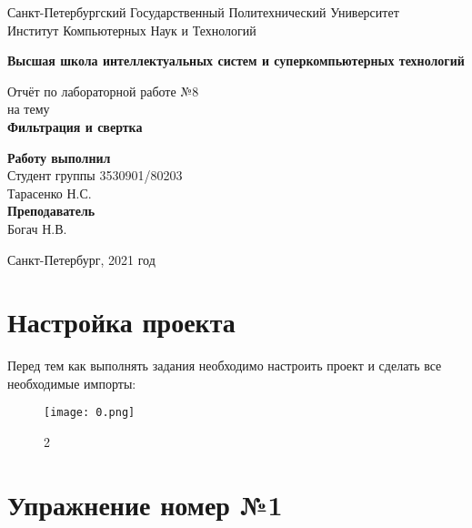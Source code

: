 \documentclass[10pt,a4paper,oneside]{article}
\begin{document}
\begin{titlepage}
\newpage
	\begin{center}
		\Large Санкт-Петербургский Государственный Политехнический Университет\\
		Институт Компьютерных Наук и Технологий\\
	\end{center}
	\begin{center}
		\large\textbf {Высшая школа интеллектуальных систем и суперкомпьютерных технологий}
	\end{center}
	
	\vspace{5em}
	\begin{center}
		\large{Отчёт по лабораторной работе №8 \\ на тему \\
		\textbf{Фильтрация и свертка} }
	\end{center}
	
	\vspace{25em}
	\begin{flushright}
		\textbf{Работу выполнил\\}Студент группы 3530901/80203 \\ Тарасенко Н.С.\\
		\textbf{Преподаватель\\}Богач Н.В. 
	\end{flushright}
	
	\vspace{\fill}%
	\begin{center}
	Санкт-Петербург, 2021 год	
	\end{center}
\end{titlepage} %

\section{Настройка проекта}
Перед тем как выполнять задания необходимо настроить проект и сделать все необходимые импорты:

\begin{figure}[H]
        \centering
        \texttt{[image: 0.png]}
        \caption{2}
        \label{fig:first}
\end{figure}

\section{Упражнение номер №1}
\end{document}
